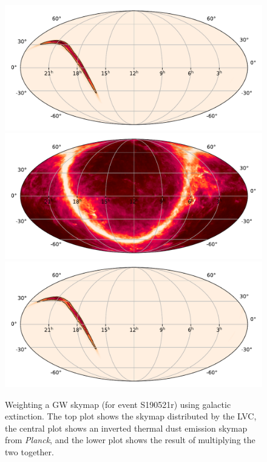 \begin{colsection}
\begin{figure}[p]
    \begin{center}
        \includegraphics[width=0.8\linewidth]{images/tiling/ext_before.pdf}
        \includegraphics[width=0.8\linewidth]{images/tiling/ext.pdf}
        \includegraphics[width=0.8\linewidth]{images/tiling/ext_after.pdf}
    \end{center}
    \caption[Weighting a GW skymap using galactic extinction]{
        Weighting a GW skymap (for event S190521r) using galactic extinction. The top plot shows the skymap distributed by the LVC, the central plot shows an inverted thermal dust emission skymap from \textit{Planck}, and the lower plot shows the result of multiplying the two together.
    }\label{fig:extinction_skymap}
\end{figure}

\end{colsection}

